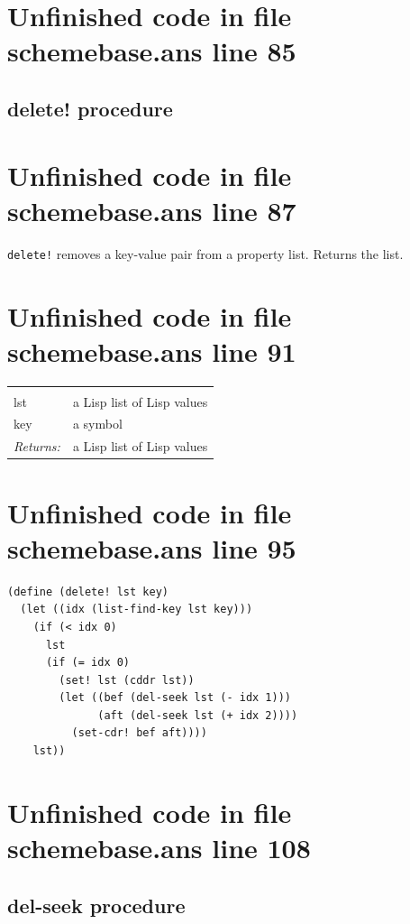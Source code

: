 \documentclass[twoside,9pt]{report}
\begin{document}
\section{Unfinished code in file schemebase.ans line 85}
\subsection{delete! procedure}
\label{delete"!-procedure}
\section{Unfinished code in file schemebase.ans line 87}


\texttt{delete!} removes a key-value pair from a property list. Returns the list.

\section{Unfinished code in file schemebase.ans line 91}
\noindent\begin{tabular}{ |p{1.9cm} p{8cm}| }
\hline
\rowcolor[HTML]{CCCCCC} \multicolumn{2}{|l|}{\bf delete! (public)} \\
lst & a Lisp list of Lisp values \\
key & a symbol \\
\textit{Returns:} & a Lisp list of Lisp values \\
\hline
\end{tabular}
\section{Unfinished code in file schemebase.ans line 95}
\begin{lstlisting}
(define (delete! lst key)
  (let ((idx (list-find-key lst key)))
    (if (< idx 0)
      lst
      (if (= idx 0)
        (set! lst (cddr lst))
        (let ((bef (del-seek lst (- idx 1)))
              (aft (del-seek lst (+ idx 2))))
          (set-cdr! bef aft))))
    lst))
\end{lstlisting}
\section{Unfinished code in file schemebase.ans line 108}
\subsection{del-seek procedure}
\label{del-seek-procedure}
\end{document}
